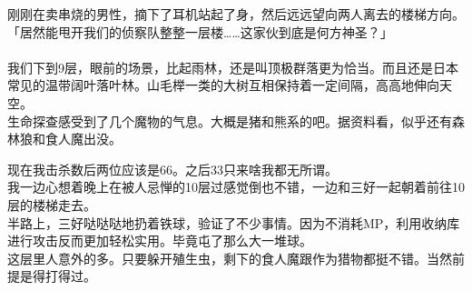 刚刚在卖串烧的男性，摘下了耳机站起了身，然后远远望向两人离去的楼梯方向。\\

「居然能甩开我们的侦察队整整一层楼……这家伙到底是何方神圣？」\\

\sqsplit\\

我们下到9层，眼前的场景，比起雨林，还是叫顶极群落更为恰当。而且还是日本常见的温带阔叶落叶林。山毛榉一类的大树互相保持着一定间隔，高高地伸向天空。\\

生命探查感受到了几个魔物的气息。大概是猪和熊系的吧。据资料看，似乎还有森林狼和食人魔出没。

现在我击杀数后两位应该是66。之后33只来啥我都无所谓。\\

我一边心想着晚上在被人忌惮的10层过感觉倒也不错，一边和三好一起朝着前往10层的楼梯走去。\\

半路上，三好哒哒哒地扔着铁球，验证了不少事情。因为不消耗MP，利用收纳库进行攻击反而更加轻松实用。毕竟屯了那么大一堆球。\\

这层里人意外的多。只要躲开殖生虫，剩下的食人魔跟作为猎物都挺不错。当然前提是得打得过。

